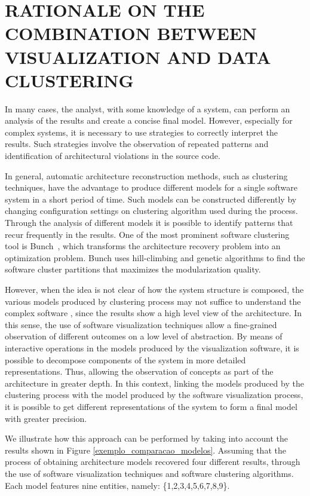 \section{RATIONALE ON THE COMBINATION BETWEEN VISUALIZATION AND DATA CLUSTERING}\label{sec:rationale}%

In many cases, the analyst, with some knowledge of a system, can perform an analysis of the results and create a concise final model. However, especially for complex systems, it is necessary to use strategies to correctly interpret the results. Such strategies involve the observation of repeated patterns and identification of architectural violations in the source code.

In general, automatic architecture reconstruction methods, such as clustering techniques, have the advantage to produce different models for a single software system in a short period of time. Such models can be constructed differently by changing configuration settings on clustering algorithm used during the process. Through the analysis of different models it is possible to identify patterns that recur frequently in the results. One of the most prominent software clustering tool is Bunch~\cite{mitchell_heuristic_2002}, which transforms the architecture recovery problem into an optimization problem. Bunch uses hill-climbing and genetic algorithms to find the software cluster partitions that maximizes the modularization quality.  %

However, when the idea is not clear of how the system structure is composed, the various models produced by clustering process may not suffice to understand the complex software \cite{craft}, since the results show a high level view of the architecture. In this sense, the use of software visualization techniques allow a fine-grained observation of different outcomes on a low level of abstraction. By means of interactive operations in the models produced by the visualization software, it is possible to decompose components of the system in more detailed representations. Thus, allowing the observation of concepts as part of the architecture in greater depth. In this context, linking the models produced by the clustering process with the model produced by the software visualization process, it is possible to get different representations of the system to form a final model with greater precision. 

We illustrate how this approach can be performed by taking into account the results shown in Figure \ref{exemplo_comparacao_modelos}. Assuming that the process of obtaining architecture models recovered four different results, through the use of software visualization techniques and software clustering algorithms. Each model features nine entities, namely: \{1,2,3,4,5,6,7,8,9\}. 

